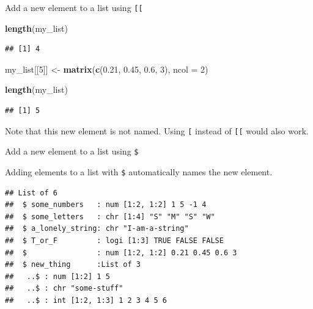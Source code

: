 \documentclass[ignorenonframetext,]{beamer}
\newenvironment{Shaded}{\begin{snugshade}}{\end{snugshade}}
\newcommand{\DataTypeTok}[1]{\textcolor[rgb]{0.13,0.29,0.53}{#1}}
\newcommand{\DecValTok}[1]{\textcolor[rgb]{0.00,0.00,0.81}{#1}}
\newcommand{\FloatTok}[1]{\textcolor[rgb]{0.00,0.00,0.81}{#1}}
\newcommand{\KeywordTok}[1]{\textcolor[rgb]{0.13,0.29,0.53}{\textbf{#1}}}
\newcommand{\NormalTok}[1]{#1}
\newcommand{\OperatorTok}[1]{\textcolor[rgb]{0.81,0.36,0.00}{\textbf{#1}}}
\newcommand{\StringTok}[1]{\textcolor[rgb]{0.31,0.60,0.02}{#1}}
\begin{document}
\begin{frame}[fragile]{Add a new element to a list using
\texttt{{[}{[}}}
\protect\hypertarget{add-a-new-element-to-a-list-using}{}

\begin{Shaded}
\begin{Highlighting}[]
\KeywordTok{length}\NormalTok{(my_list)}
\end{Highlighting}
\end{Shaded}

\begin{verbatim}
## [1] 4
\end{verbatim}

\begin{Shaded}
\begin{Highlighting}[]
\NormalTok{my_list[[}\DecValTok{5}\NormalTok{]] <-}\StringTok{ }\KeywordTok{matrix}\NormalTok{(}\KeywordTok{c}\NormalTok{(}\FloatTok{0.21}\NormalTok{, }\FloatTok{0.45}\NormalTok{, }\FloatTok{0.6}\NormalTok{, }\DecValTok{3}\NormalTok{),}
                       \DataTypeTok{ncol =} \DecValTok{2}\NormalTok{)}

\KeywordTok{length}\NormalTok{(my_list)}
\end{Highlighting}
\end{Shaded}

\begin{verbatim}
## [1] 5
\end{verbatim}

Note that this new element is not named. Using \texttt{{[}} instead of
\texttt{{[}{[}} would also work.

\end{frame}

\begin{frame}[fragile]{Add a new element to a list using \texttt{\$}}
\protect\hypertarget{add-a-new-element-to-a-list-using-1}{}

Adding elements to a list with \texttt{\$} automatically names the new
element.

\begin{Shaded}
\end{Shaded}

\begin{verbatim}
## List of 6
##  $ some_numbers   : num [1:2, 1:2] 1 5 -1 4
##  $ some_letters   : chr [1:4] "S" "M" "S" "W"
##  $ a_lonely_string: chr "I-am-a-string"
##  $ T_or_F         : logi [1:3] TRUE FALSE FALSE
##  $                : num [1:2, 1:2] 0.21 0.45 0.6 3
##  $ new_thing      :List of 3
##   ..$ : num [1:2] 1 5
##   ..$ : chr "some-stuff"
##   ..$ : int [1:2, 1:3] 1 2 3 4 5 6
\end{verbatim}

\end{frame}
\end{document}
